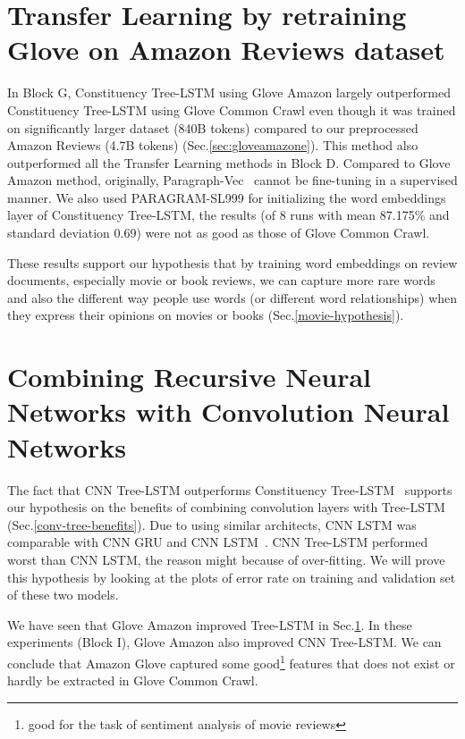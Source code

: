 \section{Transfer Learning by retraining Glove on Amazon Reviews dataset}
\label{fact:glove-amazon-improve-tree}
In Block G, Constituency Tree-LSTM using Glove Amazon largely outperformed Constituency Tree-LSTM using Glove Common Crawl even though it was trained on significantly larger dataset (840B tokens) compared to our preprocessed Amazon Reviews (4.7B tokens) (Sec.\ref{sec:gloveamazone}).
This method also outperformed all the Transfer Learning methods in Block D.
Compared to Glove Amazon method, originally,  Paragraph-Vec~\cite{ParagraphVec} cannot be fine-tuning in a supervised manner.
We also used PARAGRAM-SL999 for initializing the word embeddings layer of Constituency Tree-LSTM,
the results (of 8 runs with mean 87.175\% and standard deviation 0.69) were not as good as those of Glove Common Crawl.

These results support our hypothesis that by training word embeddings on review documents, especially movie or book reviews, we can capture more rare words and also the different way people use words (or different word relationships) when they express their opinions on movies or books (Sec.\ref{movie-hypothesis}).

\section{Combining Recursive Neural Networks with Convolution Neural Networks}
\label{proved:tree-conv-benefit}
The fact that CNN Tree-LSTM outperforms Constituency Tree-LSTM~\cite{treeLSTM} supports our hypothesis on the benefits of combining convolution layers with Tree-LSTM (Sec.\ref{conv-tree-benefits}).
Due to using similar architects, CNN LSTM was comparable with CNN GRU and CNN LSTM~\cite{cnn-rnn}. \label{unproved:cnn-treelstm-overfit}
CNN Tree-LSTM performed worst than CNN LSTM, the reason might because of over-fitting.
We will prove this hypothesis by looking at the plots of error rate on training and validation set of these two models.

\label{proved:Amazon-adv-Common}
We have seen that Glove Amazon improved Tree-LSTM in Sec.\ref{fact:glove-amazon-improve-tree}.
In these experiments (Block I), Glove Amazon also improved CNN Tree-LSTM.
We can conclude that Amazon Glove captured some good\footnote{good for the task of sentiment analysis of movie reviews} features that does not exist or hardly be extracted in Glove Common Crawl.

